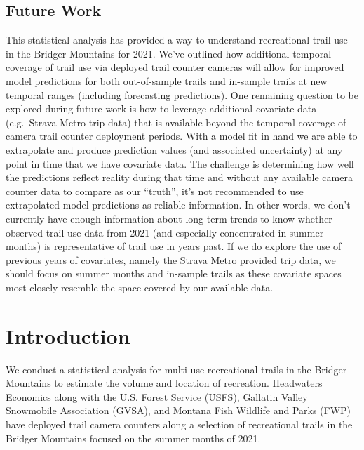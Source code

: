 \documentclass[
]{book}
\begin{document}
\hypertarget{future-work}{%
\section{Future Work}\label{future-work}}

This statistical analysis has provided a way to understand recreational trail use in the Bridger Mountains for 2021. We've outlined how additional temporal coverage of trail use via deployed trail counter cameras will allow for improved model predictions for both out-of-sample trails and in-sample trails at new temporal ranges (including forecasting predictions). One remaining question to be explored during future work is how to leverage additional covariate data (e.g.~Strava Metro trip data) that is available beyond the temporal coverage of camera trail counter deployment periods. With a model fit in hand we are able to extrapolate and produce prediction values (and associated uncertainty) at any point in time that we have covariate data. The challenge is determining how well the predictions reflect reality during that time and without any available camera counter data to compare as our ``truth'', it's not recommended to use extrapolated model predictions as reliable information. In other words, we don't currently have enough information about long term trends to know whether observed trail use data from 2021 (and especially concentrated in summer months) is representative of trail use in years past. If we do explore the use of previous years of covariates, namely the Strava Metro provided trip data, we should focus on summer months and in-sample trails as these covariate spaces most closely resemble the space covered by our available data.

\hypertarget{introduction}{%
\chapter{Introduction}\label{introduction}}

We conduct a statistical analysis for multi-use recreational trails in the Bridger Mountains to estimate the volume and location of recreation. Headwaters Economics along with the U.S. Forest Service (USFS), Gallatin Valley Snowmobile Association (GVSA), and Montana Fish Wildlife and Parks (FWP) have deployed trail camera counters along a selection of recreational trails in the Bridger Mountains focused on the summer months of 2021.
\end{document}
